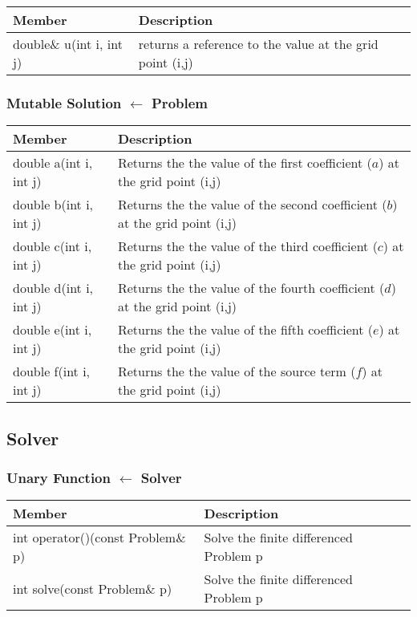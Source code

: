 \documentclass{article}
\begin{document}
\begin{tabular}[!htb]{|p{5.25 cm}|p{8 cm}|}
\hline
Member&	Description\\
\hline
double\& u(int i, int j)&	returns a reference to the value at the grid point (i,j)\\
\hline
\end{tabular}

\subsubsection{Mutable Solution $\leftarrow$ Problem}

\begin{tabular}[!htb]{|p{5.25 cm}|p{8 cm}|}
\hline
Member&	Description\\
\hline
double a(int i, int j)&	Returns the the value of the first coefficient ($a$) at the grid point (i,j)\\
\hline
double b(int i, int j)&	Returns the the value of the second coefficient ($b$) at the grid point (i,j)\\
\hline
double c(int i, int j)&	Returns the the value of the third coefficient ($c$) at the grid point (i,j)\\
\hline
double d(int i, int j)&	Returns the the value of the fourth coefficient ($d$) at the grid point (i,j)\\
\hline
double e(int i, int j)&	Returns the the value of the fifth coefficient ($e$) at the grid point (i,j)\\
\hline
double f(int i, int j)&	Returns the the value of the source term ($f$) at the grid point (i,j)\\
\hline
\end{tabular}

\subsection{Solver}
\subsubsection{Unary Function $\leftarrow$ Solver}

\begin{tabular}[!htb]{|p{5.25 cm}|p{8 cm}|}
\hline
Member&	Description\\
\hline
int operator()(const Problem\& p)&	Solve the finite differenced Problem p\\
\hline
int solve(const Problem\& p)&	Solve the finite differenced Problem p\\
\hline
\end{tabular}
\end{document}
